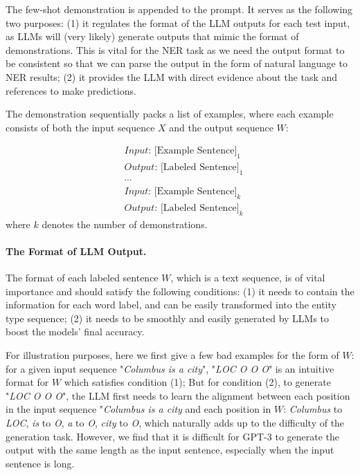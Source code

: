 \documentclass[11pt]{article}
\begin{document}
The few-shot demonstration is appended to the prompt.
It
 serves as the following two purposes: 
(1) it regulates the format of the LLM outputs for each test input, as 
LLMs will (very likely)
generate outputs that mimic the format of demonstrations. This is vital for the NER task as we need the output format to be consistent so that we can parse the output in the form of natural language 
to NER results; (2) it provides the LLM with direct evidence about the task and references to make predictions. 

The demonstration sequentially packs a list of examples, where each example consists of both the input sequence $X$ and the output sequence $W$: 


\begin{equation}
\nonumber
    \begin{aligned}
      	&\textit{Input: }\text{[Example Sentence]}_{1} \\
      	&\textit{Output: }\text{[Labeled Sentence]}_{1} \\
      	&\cdots \\
      	&\textit{Input: }\text{[Example Sentence]}_{k} \\
      	&\textit{Output: }\text{[Labeled Sentence]}_{k}
    \end{aligned}
\end{equation}
where $k$ denotes the number of demonstrations. 

\paragraph{The Format of LLM Output.}
\label{llm_format}
The format of each labeled sentence $W$, which is a text sequence, is of vital importance and should satisfy the following conditions:
(1) it needs to contain the information for each word label, and can be easily transformed into the entity type sequence; 
(2) it needs to be smoothly and easily generated by LLMs to boost the models' final accuracy. 

For illustration purposes, here we first give a few bad examples for the form of $W$: 
for a given input sequence "{\it Columbus is a city}", 
"{\it LOC O O O}" is an intuitive format for $W$ which satisfies condition (1); 
But for condition (2), to generate "{\it LOC O O O}", the LLM first needs to learn the alignment between each position in the input sequence "{\it Columbus is a city} and each position in $W$: {\it Columbus} to 
{\it LOC}, {\it is} to 
{\it O}, {\it a} to 
{\it O}, 
{\it city} to {\it O}, 
which naturally adds up to the difficulty of the generation task.
However, we find that it is difficult for GPT-3 to generate the output with the same length as the input sentence, especially when the input sentence is long.
\end{document}
